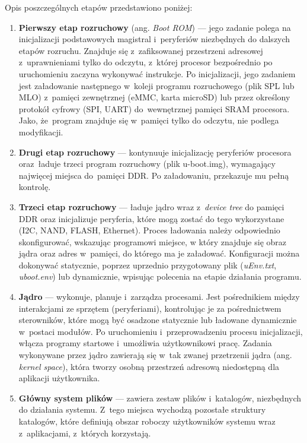 Opis poszczególnych etapów przedstawiono poniżej:
\begin{enumerate}

    \item \textbf{Pierwszy etap rozruchowy} (ang. \textit{Boot ROM}) --- jego zadanie
    polega na inicjalizacji podstawowych magistral i~peryferiów niezbędnych do
    dalszych etapów rozruchu. Znajduje się z~zafiksowanej przestrzeni adresowej
    z~uprawnieniami tylko do odczytu, z~której procesor bezpośrednio po
    uruchomieniu zaczyna wykonywać instrukcje.
    Po inicjalizacji, jego zadaniem jest załadowanie następnego w~koleji
    programu rozruchowego (plik SPL lub MLO) z~pamięci zewnętrznej (eMMC, karta
    microSD) lub przez określony protokół cyfrowy (SPI, UART) do~wewnętrznej
    pamięci SRAM procesora. Jako, że~program znajduje się w~pamięci tylko do
    odczytu, nie podlega modyfikacji.

    \item \textbf{Drugi etap rozruchowy} --- kontynuuje inicjalizację peryferiów
    procesora oraz~ładuje trzeci program rozruchowy (plik u-boot.img),
    wymagający najwięcej miejsca do~pamięci DDR. Po załadowaniu, przekazuje mu
    pełną kontrolę. 

    \item \textbf{Trzeci etap rozruchowy} --- ładuje jądro wraz z~\textit{device
    tree} do pamięci DDR oraz inicjalizuje peryferia, które mogą zostać do tego
    wykorzystane (I2C, NAND, FLASH, Ethernet). Proces ładowania należy
    odpowiednio skonfigurować, wskazując programowi miejsce, w który znajduje
    się obraz jądra oraz adres w~pamięci, do którego ma je załadować.
    Konfiguracji można dokonywać statycznie, poprzez uprzednio przygotowany plik
    (\textit{uEnv.txt}, \textit{uboot.env}) lub dynamicznie, wpisując polecenia
    na etapie działania programu.

    \item \textbf{Jądro} --- wykonuje, planuje i~zarządza procesami. Jest
    pośrednikiem między interakcjami ze sprzętem (peryferiami), kontrolując je
    za pośrednictwem sterowników, które mogą być osadzone statycznie lub
    ładowane dynamicznie w~postaci modułów. Po uruchomieniu i~przeprowadzeniu
    procesu inicjalizacji, włącza programy startowe i~umożliwia użytkownikowi
    pracę. Zadania wykonywane przez jądro zawierają się w~tak zwanej przetrzenii
    jądra (ang. \textit{kernel space}), która tworzy osobną przestrzeń adresową
    niedostępną dla aplikacji użytkownika. 

    \item \textbf{Główny system plików} --- zawiera zestaw plików i~katalogów,
    niezbędnych do działania systemu. Z~tego miejsca wychodzą pozostałe
    struktury katalogów, które definiują obszar roboczy użytkowników systemu
    wraz z~aplikacjami, z~których korzystają.

\end{enumerate}

